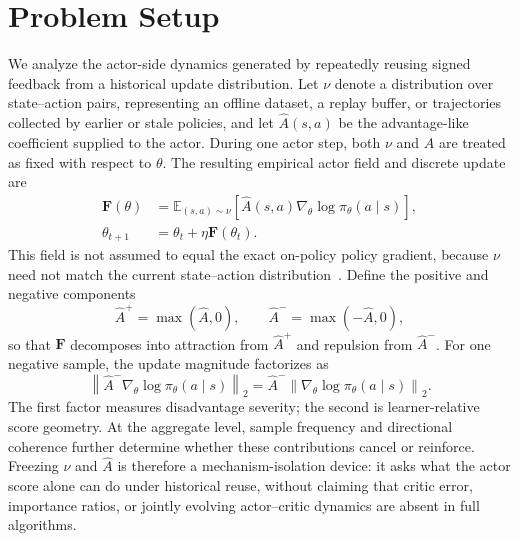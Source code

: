 \section{Problem Setup}
\label{sec:setup}

We analyze the actor-side dynamics generated by repeatedly reusing signed feedback from a historical update distribution. Let $\nu$ denote a distribution over state--action pairs, representing an offline dataset, a replay buffer, or trajectories collected by earlier or stale policies, and let $\widehat A(s,a)$ be the advantage-like coefficient supplied to the actor. During one actor step, both $\nu$ and $\widehat A$ are treated as fixed with respect to $\theta$. The resulting empirical actor field and discrete update are
\begin{equation}
\begin{aligned}
\mathbf F(\theta)
&=\mathbb E_{(s,a)\sim\nu}\!\left[\widehat A(s,a)\nabla_\theta\log\pi_\theta(a\mid s)\right],\\
\theta_{t+1}&=\theta_t+\eta\mathbf F(\theta_t).
\end{aligned}
\label{eq:signed-field}
\end{equation}
This field is not assumed to equal the exact on-policy policy gradient, because $\nu$ need not match the current state--action distribution~\cite{sutton1999policy,levine2020offline}. Define the positive and negative components
\begin{equation}
\widehat A^+=\max(\widehat A,0),\qquad \widehat A^-=\max(-\widehat A,0),
\label{eq:sign-split}
\end{equation}
so that $\mathbf F$ decomposes into attraction from $\widehat A^+$ and repulsion from $\widehat A^-$. For one negative sample, the update magnitude factorizes as
\begin{equation}
\left\|\widehat A^-\nabla_\theta\log\pi_\theta(a\mid s)\right\|_2
=\widehat A^-\left\|\nabla_\theta\log\pi_\theta(a\mid s)\right\|_2.
\label{eq:influence-factorization}
\end{equation}
The first factor measures disadvantage severity; the second is learner-relative score geometry. At the aggregate level, sample frequency and directional coherence further determine whether these contributions cancel or reinforce. Freezing $\nu$ and $\widehat A$ is therefore a mechanism-isolation device: it asks what the actor score alone can do under historical reuse, without claiming that critic error, importance ratios, or jointly evolving actor--critic dynamics are absent in full algorithms.

